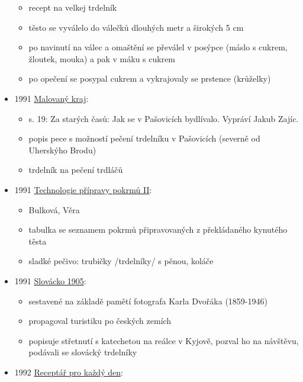 \begin{itemize}
  \begin{itemize}
  \tightlist
  \item
    recept na velkej trdelník
  \item
    těsto se vyválelo do válečků dlouhých metr a širokých 5 cm
  \item
    po navinutí na válec a omaštění se převálel v posýpce (máslo s
    cukrem, žloutek, mouka) a pak v máku s cukrem
  \item
    po opečení se posypal cukrem a vykrajovaly se prstence (krůželky)
  \end{itemize}
\item
  1991
  \href{https://ceskadigitalniknihovna.cz/uuid/uuid:b0598360-1be3-11e4-a8ab-001018b5eb5c}{Malovaný
  kraj}:

  \begin{itemize}
  \tightlist
  \item
    s. 19: Za starých časů: Jak se v Pašovicích bydlívalo. Vypráví Jakub
    Zajíc.
  \item
    popis pece s možností pečení trdelníku v Pašovicích (severně od
    Uherskýho Brodu)
  \item
    trdelník na pečení trdláčů
  \end{itemize}
\item
  1991
  \href{https://ceskadigitalniknihovna.cz/uuid/uuid:2e23e200-3d6d-11e3-9c86-005056827e51}{Technologie
  přípravy pokrmů II}:

  \begin{itemize}
  \tightlist
  \item
    Bulková, Věra
  \item
    tabulka se seznamem pokrmů připravovaných z překládaného kynutého
    těsta
  \item
    sladké pečivo: trubičky /trdelníky/ s pěnou, koláče
  \end{itemize}
\item
  1991
  \href{https://ceskadigitalniknihovna.cz/uuid/uuid:f87ff390-1ab3-11e3-9319-005056827e51}{Slovácko
  1905}:

  \begin{itemize}
  \tightlist
  \item
    sestavené na základě pamětí fotografa Karla Dvořáka (1859-1946)
  \item
    propagoval turistiku po českých zemích
  \item
    popisuje střetnutí s katechetou na reálce v Kyjově, pozval ho na
    návštěvu, podávali se slovácký trdelníky
  \end{itemize}
\item
  1992
  \href{https://ceskadigitalniknihovna.cz/uuid/uuid:3cd82b40-62fb-11e3-9ea2-5ef3fc9ae867}{Receptář
  pro každý den}:


\end{itemize}
